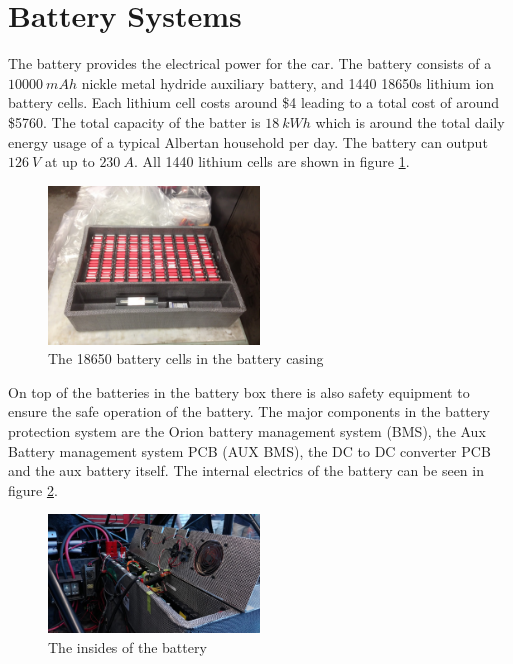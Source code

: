 \documentclass{article}
\begin{document}
    \section{Battery Systems}
    The battery provides the electrical power for the car. The battery
    consists of a $10 000\ mAh$ nickle metal hydride auxiliary battery,
    and 1440 18650s lithium ion battery cells. Each lithium cell costs
    around \$4 leading to a total cost of around \$5760. The total
    capacity of the batter is $18\ kWh$ which is around the total daily
    energy usage of a typical Albertan household per day. The battery
    can output $126\ V$ at up to $230\ A$. All 1440 lithium cells are
    shown in figure \ref{fig:bat_cells}.
    \begin{figure}
        \centering
        \includegraphics[width=0.5\textwidth]{images/cells.jpg}
        \caption{The 18650 battery cells in the battery casing}
        \label{fig:bat_cells}
    \end{figure}
    On top of the batteries in the battery box there is also safety
    equipment to ensure the safe operation of the battery. The major
    components in the battery protection system are the Orion battery
    management system (BMS), the Aux Battery management system PCB
    (AUX BMS), the DC to DC converter PCB and the aux battery itself.
    The internal electrics of the battery can be seen in figure
    \ref{fig:bat-in}.
    \begin{figure}[H]
        \centering
        \includegraphics[width=0.5\textwidth]{images/batt-elec.jpg}
        \caption{The insides of the battery}
        \label{fig:bat-in}
    \end{figure}
\end{document}

